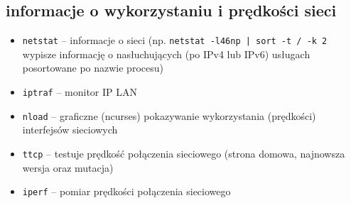 \subsection{informacje o wykorzystaniu i prędkości sieci}
\begin{itemize}
	\item \Verb#netstat# –
		 informacje o sieci
		 (np. \Verb#netstat -l46np | sort -t / -k 2# wypisze informację o nasłuchujących (po IPv4 lub IPv6) usługach posortowane po nazwie procesu)
	\item \Verb#iptraf# –
		monitor IP LAN
	\item \Verb#nload# –
		graficzne (ncurses) pokazywanie wykorzystania (prędkości) interfejsów sieciowych
	
	\item \Verb#ttcp# –
		testuje prędkość połączenia sieciowego (strona domowa, najnowsza wersja oraz mutacja)
	\item \Verb#iperf# –
		pomiar prędkości połączenia sieciowego
\end{itemize}

\setcounter{subsection}{0}
